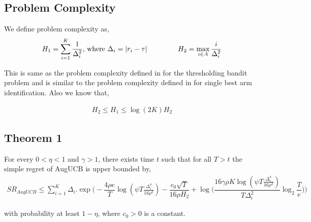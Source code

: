 

\subsection{Problem Complexity}

We define problem complexity as,
\begin{align*}
H_{1} = \sum_{i=1}^{K}\dfrac{1}{\Delta_{i}^{2}} \text{, where } \Delta_{i}=|r_{i}-\tau| \text{                \hspace*{4em}} H_{2}=\max_{i\in A}\dfrac{i}{{\Delta_{i}^{2}}}
\end{align*}

This is same as the problem complexity defined in \cite{locatelli2016optimal} for the thresholding bandit problem and is similar to the problem complexity defined in \cite{audibert2010best} for single best arm identification. Also we know that,

\begin{align*}
H_{2}\leq H_{1}\leq \log(2K)H_{2}
\end{align*}


\subsection{Theorem 1}

\begin{theorem}
\label{Result:Theorem:1}

For every $0<\eta <1$ and $\gamma > 1$, there exists time $t$ such that for all $T>t$ the simple regret of AugUCB is upper bounded by,
\begin{align*}
SR_{AugUCB} \leq \sum_{i=1}^{K} \Delta_{i}. \exp\bigg(-\dfrac{4\rho e}{T}\log (\psi T\frac{\Delta_{i}^{4}}{16\rho^{2}})-\dfrac{c_{0}\sqrt{T}}{16\rho H_{2}} + \log \big( \dfrac{16\gamma\rho K\log (\psi T \frac{\Delta_{i}^{4}}{16\rho^{2}})}{T\Delta_{i}^{2}}\log_{2}\dfrac{T}{e} \big) \bigg)
\end{align*}

with probability at least $1-\eta$, where $c_{0}>0$ is a constant.

\end{theorem}


